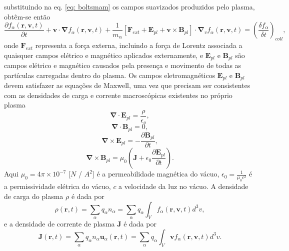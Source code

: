 \documentclass[12pt,oneside,a4paper]{abntex2}
\begin{document}
substituindo na eq. \ref{eq: boltsmam} os campos suavizados produzidos pelo plasma, obtêm-se então
\begin{equation}
\label{eq: boltzzz}
\frac{\partial f_\alpha(\bm{r},\bm{v},t)}{\partial t} +\bm{v} \cdot \bm{\nabla} f_\alpha(\bm{r},\bm{v},t) + \frac{1}{m_\alpha}[\bm{F}_{ext}+\bm{E}_{pl}+\bm{v} \times \bm{B}_{pl}] \cdot \bm{\nabla}_v f_\alpha(\bm{r},\bm{v},t)= \left( \frac{\delta f_\alpha}{\delta t} \right)_{coll},
\end{equation}
onde $\bm{F}_{ext}$ representa a força externa, incluindo a força de Lorentz associada a quaisquer campos elétrico e magnético aplicados externamente, e $\bm{E}_{pl}$ e $\bm{B}_{pl}$ são campos elétrico e magnético causados pela presença e movimento de todas as partículas carregadas dentro do plasma. Os campos eletromagnéticos $\bm{E}_{pl}$ e $\bm{B}_{pl}$  devem satisfazer as equações de Maxwell, uma vez que precisam ser consistentes com as densidades de carga e corrente macroscópicas existentes no próprio plasma
\begin{equation}
\label{eq: max1}
\bm{\nabla} \cdot \bm{E}_{pl} = \frac{\rho}{\epsilon_o},
\end{equation}
\begin{equation}
\label{eq: max2}
\bm{\nabla} \cdot \bm{B}_{pl} = 0,
\end{equation}
\begin{equation}
\label{eq: max3}
\bm{\nabla} \times \bm{E}_{pl} = -\frac{\partial \bm{B}_{pl}}{\partial t},
\end{equation}
\begin{equation}
\label{eq: max4}
\bm{\nabla} \times \bm{B}_{pl} = \mu_0 (\bm{J} + \epsilon_0 \frac{\partial \bm{E}_{pl}}{\partial t} ).
\end{equation}
Aqui $\mu_0 = 4\pi \times 10^{-7}$ [$N$ / $A^2$] é a permeabilidade magnética do vácuo, $\epsilon_0 = \frac{1}{\mu_0 c^2}$ é a permissividade elétrica do vácuo, $c$ a velocidade da luz no vácuo. 
A densidade de carga do plasma $\rho$ é dada por
\begin{equation}
\label{eq: rho}
\rho(\bm{r},t) = \sum_\alpha q_\alpha n_\alpha = \sum_\alpha q_\alpha \int_V f_\alpha(\bm{r},\bm{v},t) d^3v,
\end{equation}
e a densidade de corrente de plasma $\bm{J}$ é dada por
\begin{equation}
\label{eq: densidadecorrente}
\bm{J}(\bm{r},t) = \sum_\alpha q_\alpha n_\alpha \bm{u}_\alpha(\bm{r},t) = \sum_\alpha  q_\alpha \int_V \bm{v} f_\alpha(\bm{r},\bm{v},t) d^3v.
\end{equation}
\end{document}
